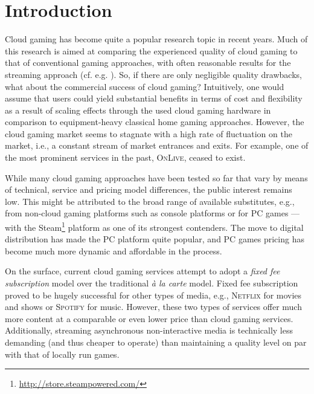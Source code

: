 

\section{Introduction}

Cloud gaming has become quite a popular research topic in recent years. Much of this research is aimed at comparing the experienced quality of cloud gaming to that of conventional gaming approaches, with often reasonable results for the streaming approach (cf. e.g. \cite{5976180}). So, if there are only negligible quality drawbacks, what about the commercial success of cloud gaming? Intuitively, one would assume that users could yield substantial benefits in terms of cost and flexibility as a result of scaling effects through the used cloud gaming hardware in comparison to equipment-heavy classical home gaming approaches. However, the cloud gaming market seems to stagnate with a high rate of fluctuation on the market, i.e., a constant stream of market entrances and exits. For example, one of the most prominent services in the past, \textsc{OnLive}, ceased to exist.




While many cloud gaming approaches have been tested so far that vary by means of technical, service and pricing model differences, the public interest remains low. This might be attributed to the broad range of available substitutes, e.g., from non-cloud gaming platforms such as console platforms or for PC games --- with the Steam\footnote{\url{http://store.steampowered.com/}} platform as one of its strongest contenders. The move to digital distribution has made the PC platform quite popular, and PC games pricing has become much more dynamic and affordable in the process.

On the surface, current cloud gaming services attempt to adopt a \textit{fixed fee subscription} model over the traditional \textit{à la carte} model. Fixed fee subscription proved to be hugely successful for other types of media, e.g., \textsc{Netflix} for movies and shows or \textsc{Spotify} for music. However, these two types of services  offer much more content at a comparable or even lower price than cloud gaming services. Additionally, streaming asynchronous non-interactive media is technically less demanding (and thus cheaper to operate) than maintaining a quality level on par with that of locally run games.

